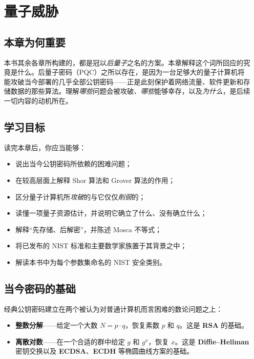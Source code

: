\chapter{量子威胁}
\label{ch:quantum}

\section{本章为何重要}

本书其余各章所构建的，都是冠以\emph{后量子}之名的方案。本章解释这个词所回应的究竟是什么。后量子密码（PQC）之所以存在，是因为一台足够大的量子计算机将能攻破当今部署的几乎全部公钥密码——正是此刻保护着网络流量、软件更新和存储数据的那些算法。理解\emph{哪些}问题会被攻破、\emph{哪些}能够幸存，以及\emph{为什么}，是后续一切内容的动机所在。

\section{学习目标}

读完本章后，你应当能够：

\begin{itemize}
  \item 说出当今公钥密码所依赖的困难问题；
  \item 在较高层面上解释 Shor 算法和 Grover 算法的作用；
  \item 区分量子计算机所\emph{攻破}的与它仅仅\emph{削弱}的；
  \item 读懂一项量子资源估计，并说明它确立了什么、没有确立什么；
  \item 解释“先存储、后解密”，并陈述 Mosca 不等式；
  \item 将已发布的 NIST 标准和主要数学家族置于其背景之中；
  \item 解读本书中为每个参数集命名的 NIST 安全类别。
\end{itemize}

\section{当今密码的基础}

经典公钥密码建立在两个被认为对普通计算机而言困难的数论问题之上：

\begin{itemize}
  \item \textbf{整数分解}——给定一个大数 $N = p\cdot q$，恢复素数 $p$ 和 $q$。这是 \textbf{RSA} 的基础。
  \item \textbf{离散对数}——在一个合适的群中给定 $g$ 和 $g^x$，恢复 $x$。这是 \textbf{Diffie--Hellman} 密钥交换以及 \textbf{ECDSA}、\textbf{ECDH} 等椭圆曲线方案的基础。
\end{itemize}

